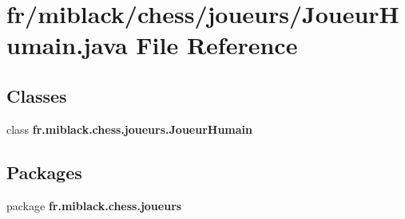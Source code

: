 \section{fr/miblack/chess/joueurs/\-Joueur\-Humain.java File Reference}
\label{JoueurHumain_8java}
\subsection*{Classes}
\begin{DoxyCompactItemize}
\item 
class {\bf fr.\-miblack.\-chess.\-joueurs.\-Joueur\-Humain}
\end{DoxyCompactItemize}
\subsection*{Packages}
\begin{DoxyCompactItemize}
\item 
package {\bf fr.\-miblack.\-chess.\-joueurs}
\end{DoxyCompactItemize}
